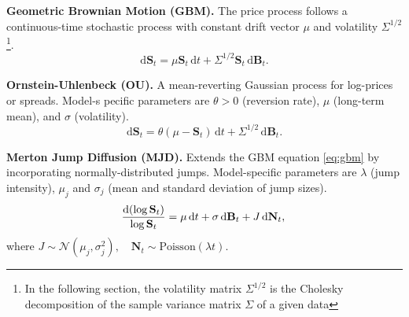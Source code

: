         
        

      \begin{enumerate}[label=\textbf{[A\arabic*]}]
        \item \label{alg:gbm} \textbf{Geometric Brownian Motion 
        (GBM).} 
        The price process follows a continuous-time stochastic 
        process with constant drift vector $\mu$ and volatility $\Sigma^{1/2}$ 
        \footnote{In the following section, the volatility matrix $\Sigma^{1/2}$ is the
        Cholesky decomposition of the sample variance matrix $\Sigma$ of a given data}.
        \begin{equation}
        \mathrm{d}\mathbf{S}_t = \mu \mathbf{S}_t\,\mathrm{d}t + \Sigma^{1/2} \mathbf{S}_t\,\mathrm{d}\mathbf{B}_t.
        \label{eq:gbm}
        \end{equation}

        \item \label{alg:ou} \textbf{Ornstein-Uhlenbeck (OU).} 
        A mean-reverting Gaussian process for log-prices or 
        spreads. Model-s  pecific parameters are \(\theta>0\) 
        (reversion rate), \(\mu\) (long-term mean), and \(\sigma\) 
        (volatility).
        \begin{equation}
        \mathrm{d}\mathbf{S}_t = \theta(\mu - \mathbf{S}_t)\,\mathrm{d}t + \Sigma^{1/2} \,\mathrm{d}\mathbf{B}_t.
        \end{equation}

        \item \label{alg:mjd} \textbf{Merton Jump Diffusion (MJD).} 
        Extends the GBM equation \eqref{eq:gbm} by incorporating 
        normally-distributed jumps. 
        Model-specific parameters are \(\lambda\) (jump intensity), 
        \(\mu_j\) and \(\sigma_j\) (mean and standard deviation of 
        jump sizes).
        \begin{equation}
        \frac{\mathrm{d}(\log\mathbf{S}_t)}{\log\mathbf{S}_t} = \mu\,\mathrm{d}t + \sigma\,\mathrm{d}\mathbf{B}_t + J\,\mathrm{d}\mathbf{N}_t,\\
        \end{equation}
        where $J \sim \mathcal N(\mu_j, \sigma_j^2),\quad \mathbf{N}_t\sim\mathrm{Poisson}(\lambda t)$.



\end{enumerate}
